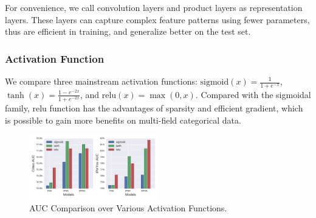 \documentclass[conference]{IEEEtran}
\newcommand{\sigmoid}{\text{sigmoid}}
\newcommand{\relu}{\text{relu}}
\begin{document}
For convenience, we call convolution layers and product layers as representation layers.
These layers can capture complex feature patterns using fewer parameters, thus are efficient in training, and generalize better on the test set.


\subsubsection{Activation Function}
We compare three mainstream activation functions: $\sigmoid(x) = \frac{1}{1+e^{-x}}$, $\tanh(x) = \frac{1 - e^{-2x}}{1 + e^{-2x}}$, and $\relu(x) = \max(0, x)$.
Compared with the sigmoidal family, relu function has the advantages of sparsity and efficient gradient, which is possible to gain more benefits on multi-field categorical data.

\begin{figure}[t]
	\centering
	\includegraphics[width=0.5\textwidth]{figure/nn-auc-2.pdf}
	\caption{AUC Comparison over Various Activation Functions.}\label{fig:act}
\end{figure}
\end{document}
